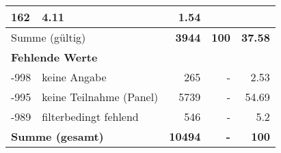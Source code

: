 \begin{longtable}{lXrrr}
       \num{162} &
       \num[round-mode=places,round-precision=2]{4,11} &
         \num[round-mode=places,round-precision=2]{1,54} \\
     \midrule
     \multicolumn{2}{l}{Summe (gültig)} &
       \textbf{\num{3944}} &
     \textbf{100} &
       \textbf{\num[round-mode=places,round-precision=2]{37,58}} \\
     \multicolumn{5}{l}{\textbf{Fehlende Werte}}\\
       -998 &
       keine Angabe &
         \num{265} &
        - &
         \num[round-mode=places,round-precision=2]{2,53} \\
       -995 &
       keine Teilnahme (Panel) &
         \num{5739} &
        - &
         \num[round-mode=places,round-precision=2]{54,69} \\
       -989 &
       filterbedingt fehlend &
         \num{546} &
        - &
         \num[round-mode=places,round-precision=2]{5,2} \\
     \midrule
     \multicolumn{2}{l}{\textbf{Summe (gesamt)}} &
          \textbf{\num{10494}} &
        \textbf{-} &
        \textbf{100} \\
     \bottomrule
     \end{longtable}
     
